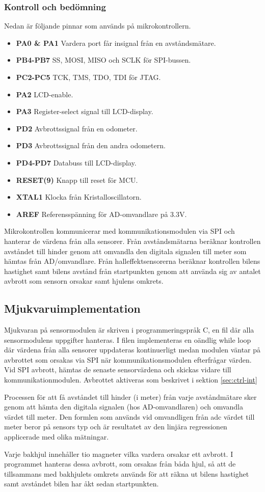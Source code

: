 \documentclass[tekniskrapport/tech.tex]{subfiles}
\begin{document}
\subsubsection{Kontroll och bedömning}
Nedan är följande pinnar som används på mikrokontrollern.
\begin{itemize}
   \item \textbf{PA0 \& PA1} Vardera port får insignal från en avståndsmätare.
   \item \textbf{PB4-PB7} SS, MOSI, MISO och SCLK för SPI-bussen.
   \item \textbf{PC2-PC5} TCK, TMS, TDO, TDI för JTAG.
   \item \textbf{PA2} LCD-enable.
   \item \textbf{PA3} Register-select signal till LCD-display.
   \item \textbf{PD2} Avbrottssignal från en odometer.
   \item \textbf{PD3} Avbrottssignal från den andra odometern.
   \item \textbf{PD4-PD7} Databuss till LCD-display.
   \item \textbf{RESET(9)} Knapp till reset för MCU.
   \item \textbf{XTAL1} Klocka från Kristalloscillatorn. 
   \item \textbf{AREF} Referensspänning för AD-omvandlare på 3.3V.

\end{itemize}
Mikrokontrollen kommunicerar med kommunikationsmodulen via SPI och hanterar de
värdena från alla sensorer. Från avståndsmätarna beräknar kontrollen avståndet
till hinder genom att omvandla den digitala signalen till meter som hämtas från
AD/omvandlare. Från halleffektsensorerna beräknar kontrollen bilens hastighet
samt bilens avstånd från startpunkten genom att använda sig av antalet avbrott
som sensorn orsakar samt hjulens omkrets.

\subsection{Mjukvaruimplementation} 
Mjukvaran på sensormodulen är skriven i programmeringspråk C, en fil där alla
sensormodulens uppgifter hanteras. I filen implementeras en oändlig while loop
där värdena från alla sensorer uppdateras kontinuerligt medan modulen väntar på
avbrottet som orsakas via SPI när kommunikationsmodulen efterfrågar värden. Vid
SPI avbrott, hämtas de senaste sensorvärdena och skickas vidare till
kommunikationmodulen. Avbrottet aktiveras som beskrivet i sektion
\ref{sec:ctrl-int}

Processen för att få avståndet till hinder (i meter) från varje avståndmätare
sker genom att hämta den digitala signalen (hos AD-omvandlaren) och omvandla
värdet till meter. Den formlen som används vid omvandligen från adc värdet till
meter beror på sensors typ och är resultatet av den linjära regressionen
applicerade med olika mätningar.

Varje bakhjul innehåller tio magneter vilka vardera orsakar ett avbrott. I
programmet hanteras dessa avbrott, som orsakas från båda hjul, så att de tillsammans
med bakhjulets omkrets används för att räkna ut bilens hastighet samt avståndet
bilen har åkt sedan startpunkten.
\end{document}
